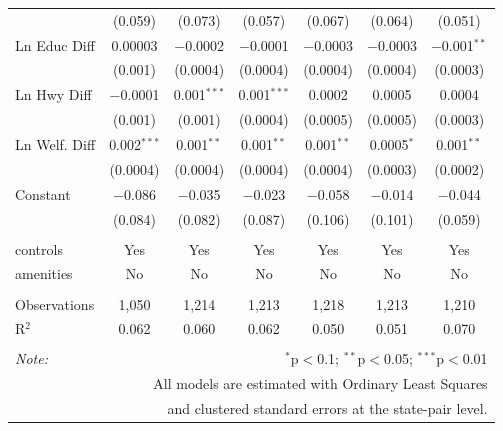 \begin{table}[!htbp]
\begin{tabular}{@{\extracolsep{5pt}}lcccccc}
  & (0.059) & (0.073) & (0.057) & (0.067) & (0.064) & (0.051) \\ 
  Ln Educ Diff & 0.00003 & $-$0.0002 & $-$0.0001 & $-$0.0003 & $-$0.0003 & $-$0.001$^{**}$ \\ 
  & (0.001) & (0.0004) & (0.0004) & (0.0004) & (0.0004) & (0.0003) \\ 
  Ln Hwy Diff & $-$0.0001 & 0.001$^{***}$ & 0.001$^{***}$ & 0.0002 & 0.0005 & 0.0004 \\ 
  & (0.001) & (0.001) & (0.0004) & (0.0005) & (0.0005) & (0.0003) \\ 
  Ln Welf. Diff & 0.002$^{***}$ & 0.001$^{**}$ & 0.001$^{**}$ & 0.001$^{**}$ & 0.0005$^{*}$ & 0.001$^{**}$ \\ 
  & (0.0004) & (0.0004) & (0.0004) & (0.0004) & (0.0003) & (0.0002) \\ 
  Constant & $-$0.086 & $-$0.035 & $-$0.023 & $-$0.058 & $-$0.014 & $-$0.044 \\ 
  & (0.084) & (0.082) & (0.087) & (0.106) & (0.101) & (0.059) \\ 
 \hline \\[-1.8ex] 
controls & Yes & Yes & Yes & Yes & Yes & Yes \\ 
amenities & No & No & No & No & No & No \\ 
\hline \\[-1.8ex] 
Observations & 1,050 & 1,214 & 1,213 & 1,218 & 1,213 & 1,210 \\ 
R$^{2}$ & 0.062 & 0.060 & 0.062 & 0.050 & 0.051 & 0.070 \\ 
\hline 
\hline \\[-1.8ex] 
\textit{Note:}  & \multicolumn{6}{r}{$^{*}$p$<$0.1; $^{**}$p$<$0.05; $^{***}$p$<$0.01} \\ 
 & \multicolumn{6}{r}{All models are estimated with Ordinary Least Squares} \\ 
 & \multicolumn{6}{r}{and clustered standard errors at the state-pair level.} \\ 
\end{tabular} 
\end{table} 
